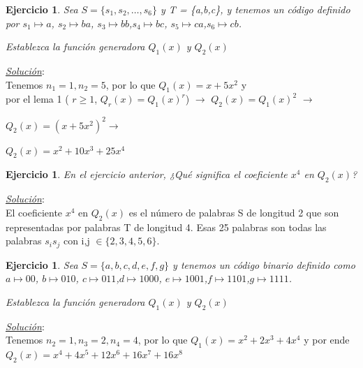 \documentclass{beamer}
\newtheorem{ejercicio} [Corolario]{Ejercicio}
\begin{document}


\begin{frame}      \small
 
 
   \begin{ejercicio}

Sea $S = \{s_1,s_2,\ldots ,s_6\}$ y T = \{a,b,c\}, y tenemos un código definido por 
$s_1\mapsto a$, $s_2\mapsto ba$, $s_3\mapsto  bb$,$s_4 \mapsto bc$, $s_5 \mapsto  ca$,$s_6 \mapsto cb$.

Establezca la función generadora $Q_1(x)$ y $Q_2(x)$  

 \end{ejercicio}
 
 \pause  
 \vspace{1cm}
  \textit{\underline{Solución}}:\\
   \vspace{0.5cm}
Tenemos $n_1=1, n_2=5$, por lo que $Q_1(x) = x + 5x^2$ y \\por el lema 1 ( $r\geq 1$, $Q_r(x)=Q_1(x)^r$) $\rightarrow$
$Q_2(x) = Q_1(x)^2$ $\rightarrow$ 

$Q_2(x) = (x + 5x^2)^2 \rightarrow$ 

$Q_2(x) = x^2 + 10x^3 + 25 x^4$

 
\end{frame}




\begin{frame}      \small
 

 \begin{ejercicio}

En el ejercicio anterior, ¿Qué significa el coeficiente $x^4$ en $Q_2(x)$?
 \end{ejercicio}
 
  \pause
  \textit{\underline{Solución}}:\\
  
   El coeficiente $x^4$ en $Q_2(x)$ es el número de palabras S de longitud 2 que son representadas por palabras T de longitud 4. Esas 25 palabras son todas las palabras $s_is_j$ con i,j $\in \{2,3,4,5,6\}.$
\end{frame}




\begin{frame}      \small
 
 \begin{ejercicio}

Sea $S = \{a, b, c, d, e, f, g\}$ y tenemos un código binario definido como 
$a\mapsto 00$, $b\mapsto 010$, $c\mapsto  011$,$d \mapsto 1000$, $e \mapsto  1001$,$f \mapsto 1101$,$g \mapsto 1111$.

Establezca la función generadora $Q_1(x)$ y $Q_2(x)$  

 \end{ejercicio}
 
 \pause
 \textit{\underline{Solución}}:\\

Tenemos $n_2=1, n_3=2, n_4=4$, por lo que $Q_1(x) = x^2 + 2x^3+ 4 x^4$ y por ende $Q_2(x) = x^4 + 4x^5 + 12 x^6 + 16 x^7+ 16 x^8$

\end{frame}
\end{document}
